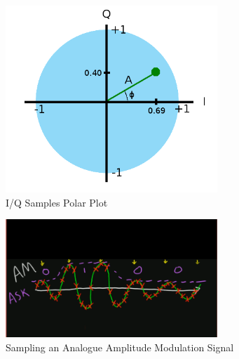 \documentclass[runningheads,a4paper]{llncs}
\begin{document}
%
\begin{figure}[here]
\centering
\includegraphics[width=8cm]{images/47}
\caption{I/Q Samples Polar Plot \citep{kuisma-14}}
\label{fig:kuisma-iq-polar}
\end{figure}
%

%
\begin{figure}[here]
\centering
\includegraphics[width=8cm]{images/46}
\caption{Sampling an Analogue Amplitude Modulation Signal \citep{ossmann-15-c}}
\label{fig:ossmann_am_demodulation}
\end{figure}
%

%


%
\end{document}
